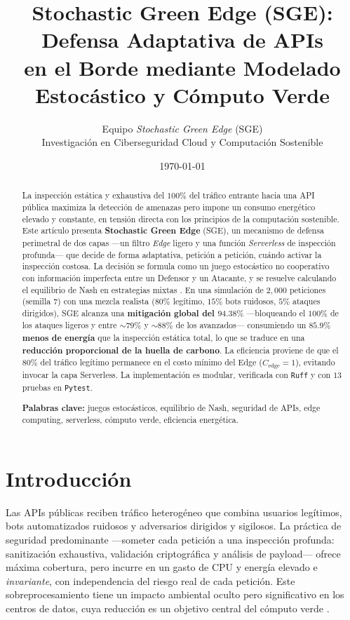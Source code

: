 \documentclass[10pt,twocolumn]{article}
\title{\vspace{-1.2em}\textbf{Stochastic Green Edge (SGE): Defensa Adaptativa de APIs\\
en el Borde mediante Modelado Estoc\'astico y C\'omputo Verde}}
\author{Equipo \emph{Stochastic Green Edge} (SGE)\\
\small Investigaci\'on en Ciberseguridad Cloud y Computaci\'on Sostenible}
\date{\today}
\begin{document}
\maketitle

\begin{abstract}
\noindent La inspecci\'on est\'atica y exhaustiva del $100\%$ del tr\'afico
entrante hacia una API p\'ublica maximiza la detecci\'on de amenazas pero impone un
consumo energ\'etico elevado y constante, en tensi\'on directa con los principios de
la computaci\'on sostenible. Este art\'iculo presenta \textbf{Stochastic Green Edge}
(SGE), un mecanismo de defensa perimetral de dos capas ---un filtro \emph{Edge}
ligero y una funci\'on \emph{Serverless} de inspecci\'on profunda--- que decide de
forma adaptativa, petici\'on a petici\'on, cu\'ando activar la inspecci\'on costosa.
La decisi\'on se formula como un juego estoc\'astico no cooperativo con informaci\'on
imperfecta entre un Defensor y un Atacante, y se resuelve calculando el equilibrio de
Nash en estrategias mixtas \cite{alpcan,manshaei}. En una simulaci\'on de $2{,}000$
peticiones (semilla $7$) con una mezcla realista ($80\%$ leg\'itimo, $15\%$ bots
ruidosos, $5\%$ ataques dirigidos), SGE alcanza una \textbf{mitigaci\'on global del
$94.38\%$} ---bloqueando el $100\%$ de los ataques ligeros y entre $\sim\!79\%$ y
$\sim\!88\%$ de los avanzados--- consumiendo un \textbf{$85.9\%$ menos de energ\'ia}
que la inspecci\'on est\'atica total, lo que se traduce en una \textbf{reducci\'on
proporcional de la huella de carbono}. La eficiencia proviene de que el $80\%$ del
tr\'afico leg\'itimo permanece en el costo m\'inimo del Edge ($C_{\text{edge}}=1$),
evitando invocar la capa Serverless. La implementaci\'on es modular, verificada con
\texttt{Ruff} y con $13$ pruebas en \texttt{Pytest}.

\vspace{4pt}
\noindent\textbf{Palabras clave:} juegos estoc\'asticos, equilibrio de Nash,
seguridad de APIs, edge computing, serverless, c\'omputo verde, eficiencia
energ\'etica.
\end{abstract}

\section{Introducci\'on}
Las APIs p\'ublicas reciben tr\'afico heterog\'eneo que combina usuarios
leg\'itimos, bots automatizados ruidosos y adversarios dirigidos y sigilosos. La
pr\'actica de seguridad predominante ---someter cada petici\'on a una inspecci\'on
profunda: sanitizaci\'on exhaustiva, validaci\'on criptogr\'afica y an\'alisis de
payload--- ofrece m\'axima cobertura, pero incurre en un gasto de CPU y energ\'ia
elevado e \emph{invariante}, con independencia del riesgo real de cada petici\'on.
Este sobreprocesamiento tiene un impacto ambiental oculto pero significativo en los
centros de datos, cuya reducci\'on es un objetivo central del c\'omputo verde
\cite{radu,murugesan}.
\end{document}
